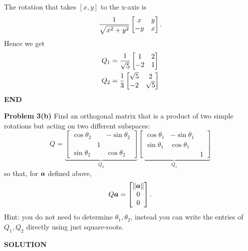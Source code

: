 \documentclass[12pt,a4paper]{article}
\def\a{ {\vc a} }
\begin{document}
The rotation that takes $[x,y]$ to the x-axis is
\[
{1 \over \sqrt{x^2+y^2}} \begin{bmatrix}
x & y \\
-y & x
\end{bmatrix}.
\]
Hence we get
\begin{align*}
Q_1 &= {1 \over \sqrt{5}} \begin{bmatrix} 1 & 2 \\ -2 & 1 \end{bmatrix} \\
Q_2 &= {1 \over 3} \begin{bmatrix} \sqrt{5} & 2 \\ -2 & \sqrt{5} \end{bmatrix}
\end{align*}
\textbf{END}

\textbf{Problem 3(b)} Find an orthogonal matrix that is a product of two simple rotations but acting on two different subspaces:
\[
Q  = \underbrace{\begin{bmatrix} \cos \ensuremath{\theta}_2 & & -\sin \ensuremath{\theta}_2  \\ & 1 \\
\sin \ensuremath{\theta}_2  & & \cos \ensuremath{\theta}_2  \end{bmatrix}}_{Q_2} \underbrace{\begin{bmatrix} \cos \ensuremath{\theta}_1 & -\sin \ensuremath{\theta}_1  \\ \sin \ensuremath{\theta}_1 & \cos \ensuremath{\theta}_1 \\ && 1 \end{bmatrix}}_{Q_1}
\]
so that, for $\ensuremath{\bm{\a}}$ defined above,
\[
Q \ensuremath{\bm{\a}}  = \begin{bmatrix} \|\ensuremath{\bm{\a}}\| \\ 0 \\ 0 \end{bmatrix}.
\]
Hint: you do not need to determine $\ensuremath{\theta}_1, \ensuremath{\theta}_2$, instead you can write the entries of  $Q_1, Q_2$  directly using just square-roots. 

\textbf{SOLUTION}
\end{document}
